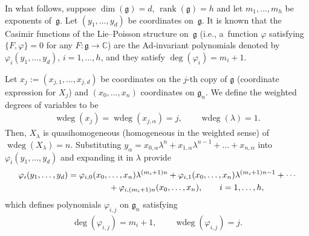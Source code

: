 \documentclass[pdftex]{sigma}
\numberwithin{equation}{section}
\begin{document}
In what follows, suppose $\dim (\mathfrak{g}) = d$, $\operatorname{rank} (\mathfrak{g}) = h$ and let $m_1 ,\dots ,m_h$ be exponents of~$\mathfrak{g}$.
Let $(y_1,\dots ,y_d)$ be coordinates on~$\mathfrak{g}$. It is known that the Casimir functions of the Lie--Poisson structure on~$\mathfrak{g}$ (i.e., a~function $\varphi $ satisfying $\{ F, \varphi \} = 0$ for any $F\colon \mathfrak{g} \to \mathbb{C}$) are the Ad-invariant polynomials denoted by $\varphi _i (y_1, \dots ,y_d)$, $i=1,\dots ,h$, and they satisfy $\deg (\varphi _i) = m_i + 1$.

Let $x_j := (x_{j,1}, \dots ,x_{j,d})$ be coordinates on the $j$-th copy of $\mathfrak{g}$ (coordinate expression for $X_j$) and $(x_0, \dots ,x_n)$ coordinates on $\mathfrak{g}_n$. We def\/ine the weighted degrees of variables to be
\begin{gather*}
\operatorname{wdeg}(x_j) = \operatorname{wdeg}(x_{j,\alpha }) = j, \qquad \operatorname{wdeg}(\lambda )=1.
\end{gather*}
Then, $X_\lambda $ is quasihomogeneous (homogeneous in the weighted sense) of $\operatorname{wdeg}(X_\lambda ) = n$. Substituting $y_\alpha = x_{0,\alpha }\lambda ^n + x_{1,\alpha }\lambda ^{n-1} + \dots +x_{n,\alpha }$ into $\varphi _i(y_1, \dots ,y_d)$ and expanding it in $\lambda $ provide
\begin{gather*}
\varphi _i(y_1, \dots ,y_d) = \varphi _{i,0}(x_0, \dots ,x_n) \lambda ^{(m_i+1)n}+\varphi _{i,1}(x_0, \dots ,x_n) \lambda ^{(m_i+1)n-1}+ \cdots\\
\hphantom{\varphi _i(y_1, \dots ,y_d) =}{} + \varphi _{i,(m_i+1)n}(x_0, \dots ,x_n), \qquad i=1,\dots ,h,
\end{gather*}
which def\/ines polynomials $\varphi _{i,j}$ on $\mathfrak{g}_n$ satisfying
\begin{gather*}
\deg (\varphi _{i,j}) = m_i+1,\qquad \operatorname{wdeg}(\varphi _{i,j}) = j.
\end{gather*}
\end{document}
